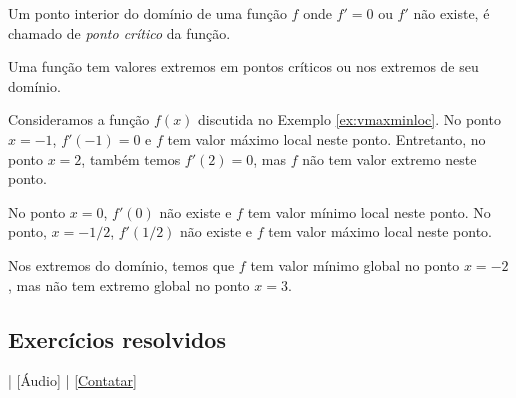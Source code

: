 Um ponto interior do domínio de uma função $f$ onde $f'=0$ ou $f'$ não existe, é chamado de \emph{ponto crítico} da função.

\begin{obs}\label{obs:pt_critico_val_extremo}
  Uma função tem valores extremos em pontos críticos ou nos extremos de seu domínio.
\end{obs}


\begin{ex}
  Consideramos a função $f(x)$ discutida no Exemplo \ref{ex:vmaxminloc}. No ponto $x=-1$, $f'(-1)=0$ e $f$ tem valor máximo local neste ponto. Entretanto, no ponto $x=2$, também temos $f'(2)=0$, mas $f$ não tem valor extremo neste ponto.

  No ponto $x=0$, $f'(0)$ não existe e $f$ tem valor mínimo local neste ponto. No ponto, $x=-1/2$, $f'(1/2)$ não existe e $f$ tem valor máximo local neste ponto.

  Nos extremos do domínio, temos que $f$ tem valor mínimo global no ponto $x=-2$, mas não tem extremo global no ponto $x=3$.
\end{ex}

\subsection*{Exercícios resolvidos}

\begin{flushright}
  [Vídeo] | [Áudio] | \href{https://phkonzen.github.io/notas/contato.html}{[Contatar]}
\end{flushright}

